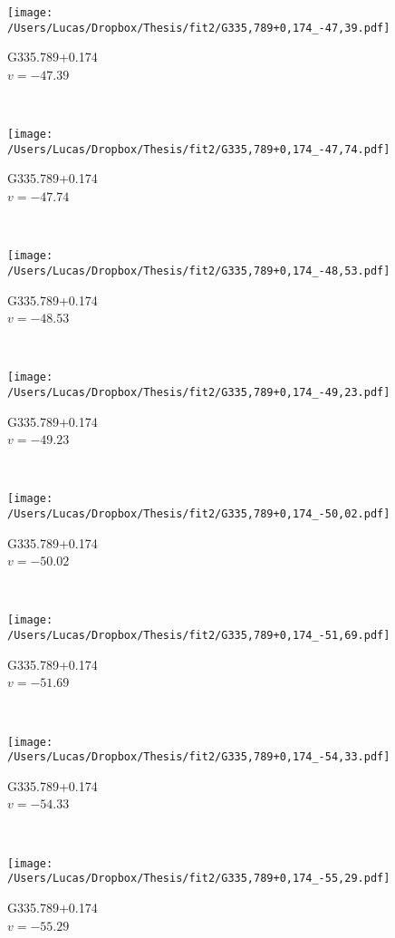 \begin{figure*}[t]\ContinuedFloat
	\centering
	\begin{subfigure}[t]{0.3\textwidth}
		\texttt{[image: /Users/Lucas/Dropbox/Thesis/fit2/G335,789+0,174\_-47,39.pdf]}
		\caption[]{G335.789+0.174\\$v=-47.39$\,\kms}
	\end{subfigure}
	~
	\begin{subfigure}[t]{0.3\textwidth}
		\texttt{[image: /Users/Lucas/Dropbox/Thesis/fit2/G335,789+0,174\_-47,74.pdf]}
		\caption[]{G335.789+0.174\\$v=-47.74$\,\kms}
	\end{subfigure}
	~
	\begin{subfigure}[t]{0.3\textwidth}
		\texttt{[image: /Users/Lucas/Dropbox/Thesis/fit2/G335,789+0,174\_-48,53.pdf]}
		\caption[]{G335.789+0.174\\$v=-48.53$\,\kms}
	\end{subfigure}
	~
	\begin{subfigure}[t]{0.3\textwidth}
		\texttt{[image: /Users/Lucas/Dropbox/Thesis/fit2/G335,789+0,174\_-49,23.pdf]}
		\caption[]{G335.789+0.174\\$v=-49.23$\,\kms}
	\end{subfigure}
	~
	\begin{subfigure}[t]{0.3\textwidth}
		\texttt{[image: /Users/Lucas/Dropbox/Thesis/fit2/G335,789+0,174\_-50,02.pdf]}
		\caption[]{G335.789+0.174\\$v=-50.02$\,\kms}
	\end{subfigure}
	~
	\begin{subfigure}[t]{0.3\textwidth}
		\texttt{[image: /Users/Lucas/Dropbox/Thesis/fit2/G335,789+0,174\_-51,69.pdf]}
		\caption[]{G335.789+0.174\\$v=-51.69$\,\kms}
	\end{subfigure}
	~
	\begin{subfigure}[t]{0.3\textwidth}
		\texttt{[image: /Users/Lucas/Dropbox/Thesis/fit2/G335,789+0,174\_-54,33.pdf]}
		\caption[]{G335.789+0.174\\$v=-54.33$\,\kms}
	\end{subfigure}
	~
	\begin{subfigure}[t]{0.3\textwidth}
		\texttt{[image: /Users/Lucas/Dropbox/Thesis/fit2/G335,789+0,174\_-55,29.pdf]}
		\caption[]{G335.789+0.174\\$v=-55.29$\,\kms}

\end{subfigure}
\end{figure*}
